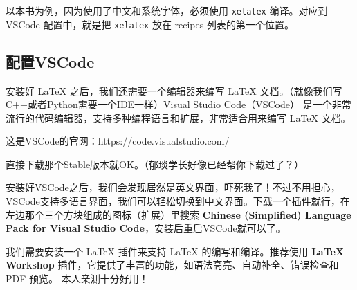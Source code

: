 以本书为例，因为使用了中文和系统字体，必须使用 \texttt{xelatex} 编译。对应到 VSCode 配置中，就是把 \texttt{xelatex} 放在 recipes 列表的第一个位置。

\subsection{配置VSCode}
安装好 \LaTeX{} 之后，我们还需要一个编辑器来编写 \LaTeX{} 文档。（就像我们写C++或者Python需要一个IDE一样）Visual Studio Code（VSCode） 是一个非常流行的代码编辑器，支持多种编程语言和扩展，非常适合用来编写 \LaTeX{} 文档。

这是VSCode的官网：https://code.visualstudio.com/

直接下载那个Stable版本就OK。（郁琰学长好像已经帮你下载过了？）

安装好VSCode之后，我们会发现居然是英文界面，吓死我了！不过不用担心，VSCode支持多语言界面，我们可以轻松切换到中文界面。下载一个插件就行，在左边那个三个方块组成的图标（扩展）里搜索 \textbf{Chinese (Simplified) Language Pack for Visual Studio Code}，安装后重启VSCode就可以了。

我们需要安装一个 \LaTeX{} 插件来支持 \LaTeX{} 的编写和编译。推荐使用 \textbf{LaTeX Workshop} 插件，它提供了丰富的功能，如语法高亮、自动补全、错误检查和 PDF 预览。
本人亲测十分好用！

